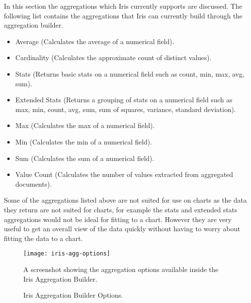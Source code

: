 \documentclass[12pt,a4paper,titlepage]{report}
\begin{document}
In this section the aggregations which Iris currently supports are discussed. The following list contains the aggregations that Iris can currently build through the aggregation builder.
\begin{itemize}
    \item Average (Calculates the average of a numerical field).
    \item Cardinality (Calculates the approximate count of distinct values).
    \item Stats (Returns basic stats on a numerical field such as count, min, max, avg, sum).
    \item Extended Stats (Returns a grouping of stats on a numerical field such as max, min, count, avg, sum, sum of squares, variance, standard deviation).
    \item Max (Calculates the max of a numerical field).
    \item Min (Calculates the min of a numerical field).
    \item Sum (Calculates the sum of a numerical field).
    \item Value Count (Calculates the number of values extracted from aggregated documents).
\end{itemize}  
Some of the aggregations listed above are not suited for use on charts as the data they return are not suited for charts, for example the stats and extended stats aggregations would not be ideal for fitting to a chart. However they are very useful to get an overall view of the data quickly without having to worry about fitting the data to a chart.
\begin{figure}[H]
\begin{tcolorbox}
\begin{center}
\texttt{[image: iris-agg-options]}
\end{center}
A screenshot showing the aggregation options available inside the Iris Aggregation Builder.
\end{tcolorbox}
\caption{Iris Aggregation Builder Options.}
\end{figure}
\end{document}
